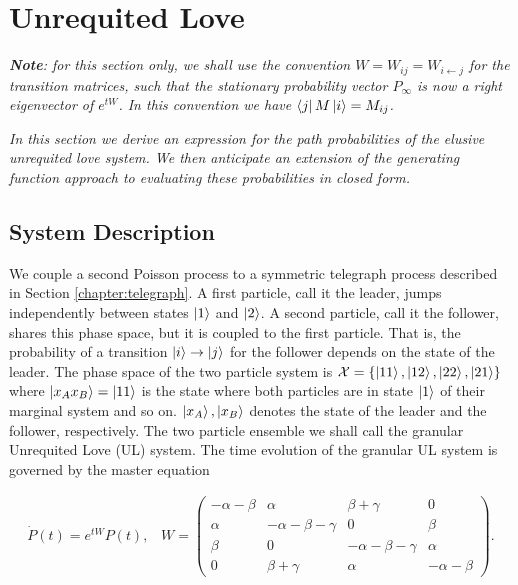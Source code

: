 \section{Unrequited Love}\label{chapter:UL1}

\textit{\textbf{Note}: for this section only, we shall use the convention $W = W_{ij} = W_{i \leftarrow j}$ for the transition matrices, such that the stationary probability vector $P_{\infty}$ is now a right eigenvector of $e^{tW}$. In this convention we have $\bra{j}M\ket{i} = M_{ij}$.}

\textit{In this section we derive an expression for the path probabilities of the elusive unrequited love system. We then anticipate an extension of the generating function approach to evaluating these probabilities in closed form.}
\subsection{System Description}

We couple a second Poisson process to a symmetric telegraph process described in Section \ref{chapter:telegraph}. A first particle, call it the leader, jumps independently between states $\ket{1}$ and $\ket{2}$. A second particle, call it the follower, shares this phase space, but it is coupled to the first particle. That is, the probability of a transition $\ket{i} \rightarrow \ket{j}$ for the follower depends on the state of the leader. The phase space of the two particle system is $\mathcal{X} = \{ \ket{11}, \ket{12}, \ket{22}, \ket{21}\}$ where $\ket{x_Ax_B} = \ket{11}$ is the state where both particles are in state $\ket{1}$ of their marginal system and so on. $\ket{x_A}, \ket{x_B}$ denotes the state of the leader and the follower, respectively. The two particle ensemble we shall call the granular Unrequited Love (UL) system. The time evolution of the granular UL system is governed by the master equation

\begin{align}
\dot{P}(t) = e^{tW}P(t), \; \; \;  W = \begin{pmatrix} -\alpha - \beta & \alpha & \beta + \gamma & 0 \\
  \alpha & -\alpha -\beta -\gamma & 0 & \beta \\
  \beta & 0 & -\alpha-\beta-\gamma & \alpha \\
  0 & \beta+\gamma & \alpha & -\alpha-\beta\end{pmatrix}.
\end{align}

